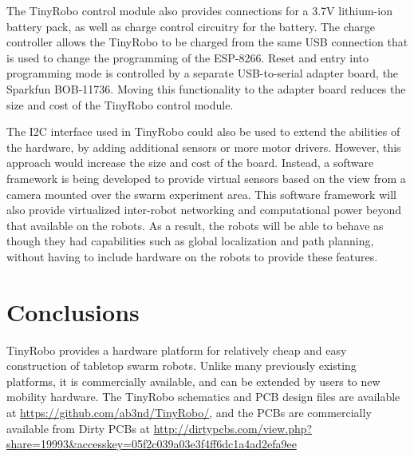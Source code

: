 \documentclass[letterpaper, 10 pt, conference]{ieeeconf}  %
\begin{document}
The TinyRobo control module also provides connections for a 3.7V lithium-ion battery pack, as well as charge control circuitry for the battery. 
The charge controller allows the TinyRobo to be charged from the same USB connection that is used to change the programming of the ESP-8266. 
Reset and entry into programming mode is controlled by a separate USB-to-serial adapter board, the Sparkfun BOB-11736.
Moving this functionality to the adapter board reduces the size and cost of the TinyRobo control module. 

The I2C interface used in TinyRobo could also be used to extend the abilities of the hardware, by adding additional sensors or more motor drivers. 
However, this approach would increase the size and cost of the board. 
Instead, a software framework is being developed to provide virtual sensors based on the view from a camera mounted over the swarm experiment area.
This software framework will also provide virtualized inter-robot networking and computational power beyond that available on the robots. 
As a result, the robots will be able to behave as though they had capabilities such as global localization and path planning, without having to include hardware on the robots to provide these features. 

\section{Conclusions}

TinyRobo provides a hardware platform for relatively cheap and easy construction of tabletop swarm robots.
Unlike many previously existing platforms, it is commercially available, and can be extended by users to new mobility hardware. 
The TinyRobo schematics and PCB design files are available at \url{https://github.com/ab3nd/TinyRobo/}, and the PCBs are commercially available from Dirty PCBs at \url{http://dirtypcbs.com/view.php?share=19993&accesskey=05f2c039a03e3f4ff6dc1a4ad2efa9ee}


\end{document}
